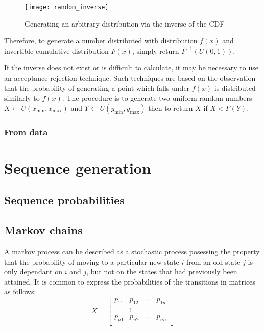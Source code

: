\begin{figure}[htbp]
  \centering
  \texttt{[image: random\_inverse]}
  \caption[Generating an arbitrary distribution via the inverse of the CDF]{Generating an arbitrary distribution via the inverse of the CDF \citep{saucier2000computer}}
  \label{fig:random_inverse}
\end{figure}

Therefore, to generate a number distributed with distribution $f(x)$ and invertible cumulative distribution $F(x)$, simply return $F^{-1}(U(0, 1))$.

If the inverse does not exist or is difficult to calculate, it may be necessary to use an acceptance rejection technique.
Such techniques are based on the observation that the probability of generating a point which falls under $f(x)$ is distributed similarly to $f(x)$.
The procedure is to generate two uniform random numbers $X \leftarrow U(x_{\min}, x_{\max})$ and $Y \leftarrow U(y_{\min}, y_{\max})$ then to return $X$ if $X<F(Y)$.

\subsubsection{From data}


\section{Sequence generation}
\subsection{Sequence probabilities}

\subsection{Markov chains}
A markov process can be described as a stochastic process posessing the
property that the probability of moving to a particular new state $i$ from an
old state $j$ is only dependant on $i$ and $j$, but not on the states that had
previously been attained.  It is common to express the probabilities of the
transitions in matrices as follows:
\begin{equation}
X = \left [ \begin{array}{cccc}
            p_{11} & p_{12}	& \ldots & p_{1n} \\
            & \vdots & \\
            p_{n1} & p_{n2} & \ldots & p_{nn}\\ 
            \end{array}\right]
\end{equation}

